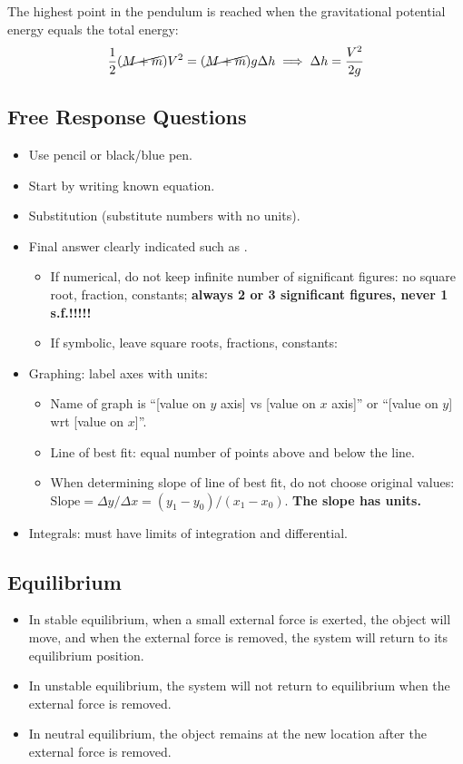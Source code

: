 \documentclass{article}
\newcommand{\remark}[2]{\begin{tcolorbox}[title={#1},colback=black!5!white,colframe=black!75!black,parbox=false] #2 \end{tcolorbox}}
\begin{document}
The highest point in the pendulum is reached when the gravitational potential energy equals the total energy:
\begin{equation*}
	\frac12(\cancel{M+m})V^2=(\cancel{M+m})g\Delta h
	\implies \Delta h=\frac{V^2}{2g}
\end{equation*}

\subsection*{Free Response Questions}

\remark{Free response}{\begin{itemize}
	\item Use pencil or black/blue pen.
	\item Start by writing known equation.
	\item Substitution (substitute numbers with no units).
	\item Final answer clearly indicated such as \boxed{\text{boxed}}.
		\begin{itemize}
			\item If numerical, do not keep infinite number of significant figures: no square root, fraction, constants; \textbf{always 2 or 3 significant figures, never 1 s.f.!!!!!}
			\item If symbolic, leave square roots, fractions, constants:
		\end{itemize}
	\item Graphing: label axes with units:
		\begin{itemize}
			\item Name of graph is ``[value on $y$ axis] vs [value on $x$ axis]'' or ``[value on $y$] wrt [value on $x$]''.
			\item Line of best fit: equal number of points above and below the line.
			\item When determining slope of line of best fit, do not choose original values: $\text{Slope}=\Delta y/\Delta x=(y_1-y_0)/(x_1-x_0)$. \textbf{The slope has units.}
		\end{itemize}
	\item Integrals: must have limits of integration and differential.
\end{itemize}}

\subsection{Equilibrium}

\begin{itemize}
	\item In stable equilibrium, when a small external force is exerted, the object will move, and when the external force is removed, the system will return to its equilibrium position.
	\item In unstable equilibrium, the system will not return to equilibrium when the external force is removed.
	\item In neutral equilibrium, the object remains at the new location after the external force is removed.
\end{itemize}
\end{document}
